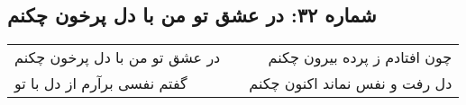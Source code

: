 \begin{center}
\section*{شماره ۳۲: در عشق تو من با دل پرخون چکنم}
\label{sec:032}
\begin{longtable}{l p{0.5cm} r}
در عشق تو من با دل پرخون چکنم
&&
چون افتادم ز پرده بیرون چکنم
\\
گفتم نفسی برآرم از دل با تو
&&
دل رفت و نفس نماند اکنون چکنم
\\
\end{longtable}
\end{center}
